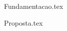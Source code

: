 \documentclass[openright]{normas-utf-tex} %
\begin{document}
\listadefiguras %
\listadetabelas %
\listadequadros %
\listadesiglas %
\listadesimbolos %

\sumario %


%
%
%
%


\setcounter{page}{12}



 {Fundamentacao.tex}

 {Proposta.tex}
\end{document}
